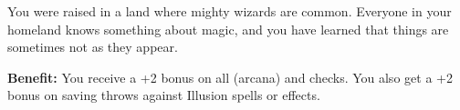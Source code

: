 
You were raised in a land where mighty wizards are common. Everyone in your homeland knows something about magic, and you have learned that things are sometimes not as they appear.

\textbf{Benefit:} You receive a +2 bonus on all  (arcana) and  checks. You also get a +2 bonus on saving throws against Illusion spells or effects.